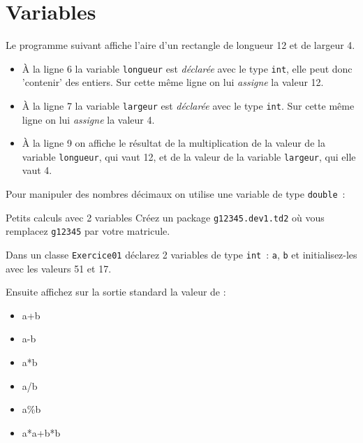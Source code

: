 \documentclass[a4paper,11pt]{style-esi/td}
\begin{document}

\section{Variables}

Le programme suivant affiche l'aire d'un rectangle de longueur 12 et de largeur 4.


\begin{itemize}
	\item \`A la ligne 6 la variable \texttt{longueur} est \emph{déclarée}
	      avec le type \texttt{int}, elle peut donc 'contenir' des entiers.
	      Sur cette même ligne on lui \emph{assigne} la valeur 12.

	\item \`A la ligne 7 la variable \texttt{largeur} est \emph{déclarée} avec le type \texttt{int}.
	      Sur cette même ligne on lui \emph{assigne} la valeur 4.

	\item \`A la ligne 9 on affiche le résultat de la multiplication de la valeur de la variable \texttt{longueur},
	      qui vaut 12, et de la valeur de la variable \texttt{largeur}, qui elle vaut 4.
\end{itemize}

Pour manipuler des nombres décimaux on utilise une variable de type
\texttt{double}~:





\begin{Exercice}{Petits calculs avec 2 variables}
	Créez un package \texttt{g12345.dev1.td2} où vous remplacez \texttt{g12345} par
	votre matricule.

	Dans un classe \texttt{Exercice01} déclarez 2 variables de type \texttt{int}~:
	\texttt{a}, \texttt{b} et initialisez-les avec les valeurs 51 et 17.

	Ensuite affichez sur la sortie standard la valeur de :
	\begin{itemize}
		\item a+b
		\item a-b
		\item a*b
		\item a/b
		\item a\%b
		\item a*a+b*b
	\end{itemize}
\end{Exercice}
\end{document}
